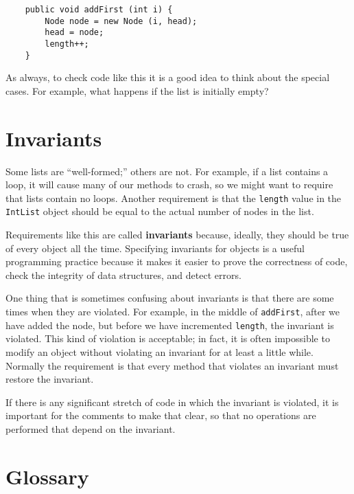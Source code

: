 \begin{verbatim}
    public void addFirst (int i) {
        Node node = new Node (i, head);
        head = node;
        length++;
    }
\end{verbatim}
%
As always, to check code like this it is a good idea to think about
the special cases.  For example, what happens if the list is initially
empty?


\section {Invariants}

Some lists are ``well-formed;'' others are not.  For example, if
a list contains a loop, it will cause many of our methods to
crash, so we might want to require that lists contain no loops.
Another requirement is that the {\tt length} value in the {\tt IntList}
object should be equal to the actual number of nodes in the list.

Requirements like this are called {\bf invariants} because, ideally,
they should be true of every object all the time.  Specifying invariants
for objects is a useful programming practice because it makes it
easier to prove the correctness of code, check the integrity of
data structures, and detect errors.

One thing that is sometimes confusing about invariants is that
there are some times when they are violated.  For example, in the
middle of {\tt addFirst}, after we have added the node, but
before we have incremented {\tt length}, the invariant is
violated.  This kind of violation is acceptable; in fact, it is
often impossible to modify an object without violating an
invariant for at least a little while.  Normally the requirement
is that every method that violates an invariant must restore
the invariant.

If there is any significant stretch of code in which the invariant
is violated, it is important for the comments to make that clear,
so that no operations are performed that depend on the invariant.



\section{Glossary}

